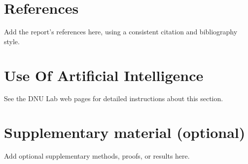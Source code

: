 \documentclass{article}
\begin{document}
\section*{References}

Add the report's references here, using a consistent citation and bibliography
style.

\appendix

\section{Use Of Artificial Intelligence}

See the DNU Lab web pages for detailed instructions about this section.


\section{Supplementary material (optional)}

Add optional supplementary methods, proofs, or results here. 
\end{document}
